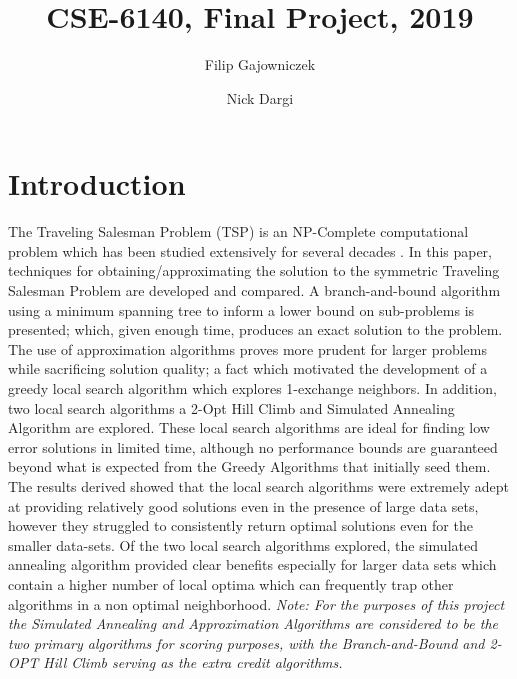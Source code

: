 \documentclass[format=sigconf]{acmart}
\begin{document}
\title{CSE-6140, Final Project, 2019}
\author{Filip Gajowniczek}
\author{Nick Dargi}


\section{Introduction}
The Traveling Salesman Problem (TSP) is an NP-Complete computational problem which has been studied extensively for several decades \cite{laporte_1992}. In this paper, techniques for obtaining/approximating the solution to the symmetric Traveling Salesman Problem are developed and compared. 
A branch-and-bound algorithm using a minimum spanning tree to inform a lower bound on sub-problems is presented; which, given enough time, produces an exact solution to the problem. The use of approximation algorithms proves more prudent for larger problems while sacrificing solution quality; a fact which motivated the development of a greedy local search algorithm which explores 1-exchange neighbors. 
In addition, two local search algorithms a 2-Opt Hill Climb and Simulated Annealing Algorithm are explored. 
These local search algorithms are ideal for finding low error solutions in limited time, although no performance bounds are guaranteed beyond 
what is expected from the Greedy Algorithms that initially seed them. The results derived showed that the local search algorithms were 
extremely adept at providing relatively good solutions even in the presence of large data sets, however they struggled to consistently return optimal solutions even for the smaller 
data-sets. Of the two local search algorithms explored, the simulated annealing algorithm provided clear benefits especially for larger data sets which contain a higher number of local optima which can frequently trap
 other algorithms in a non optimal neighborhood. \textit{Note: For the purposes of this project the Simulated Annealing 
 and Approximation Algorithms are considered to be the two primary algorithms for scoring purposes, with the Branch-and-Bound and 
 2-OPT Hill Climb serving as the extra credit algorithms.}
\end{document}
